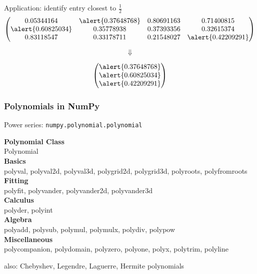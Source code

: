 \begin{frame}{Application: identify entry closest to $\frac{1}{2}$}
 \begin{displaymath}
  \begin{pmatrix}
   0.05344164 & \alert{0.37648768} & 0.80691163 & 0.71400815\\
   \alert{0.60825034} & 0.35778938 & 0.37393356 & 0.32615374\\
   0.83118547 & 0.33178711 & 0.21548027 & \alert{0.42209291}
  \end{pmatrix}
 \end{displaymath}

 \begin{displaymath}
  \Downarrow
 \end{displaymath}

 \begin{displaymath}
  \begin{pmatrix}
   \alert{0.37648768}\\ \alert{0.60825034}\\ \alert{0.42209291}
  \end{pmatrix}
 \end{displaymath}

 \vspace{0.3truecm}
\end{frame}

\begin{frame}[fragile]\frametitle{Polynomials in NumPy}
 Power series: \lstinline{numpy.polynomial.polynomial}

 \vspace{0.2truecm}
 \textbf{Polynomial Class}\\
 \small{Polynomial}\\[0.1truecm]
 \textbf{Basics}\\
 \small{polyval, polyval2d, polyval3d, polygrid2d, polygrid3d, polyroots,
        polyfromroots}\\[0.1truecm]
 \textbf{Fitting}\\
 \small{polyfit, polyvander, polyvander2d, polyvander3d}\\[0.1truecm]
 \textbf{Calculus}\\
 \small{polyder, polyint}\\[0.1truecm]
 \textbf{Algebra}\\
 \small{polyadd, polysub, polymul, polymulx, polydiv, polypow}\\[0.1truecm]
 \textbf{Miscellaneous}\\
 \small{polycompanion, polydomain, polyzero, polyone, polyx, polytrim, polyline}

 \vspace{0.2truecm}
 \small{also: Chebyshev, Legendre, Laguerre, Hermite polynomials}
\end{frame}

